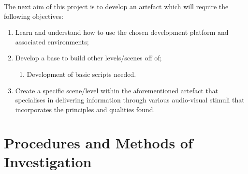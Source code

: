 The next aim of this project is to develop an artefact which will require the following objectives:
\begin{enumerate}
\item Learn and understand how to use the chosen development platform and associated environments;
\item Develop a base to build other levels/scenes off of;
\begin{enumerate}
\item Development of basic scripts needed.
\end{enumerate}
\item Create a specific scene/level within the aforementioned artefact that specialises in delivering information through various audio-visual stimuli that incorporates the principles and qualities found.
\end{enumerate}

\section{Procedures and Methods of Investigation}
